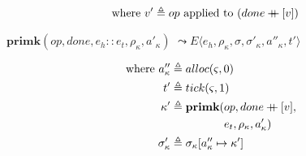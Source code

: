 \documentclass[12pt,draft]{article}
\newcommand\mdoubleplus{\ensuremath{\mathbin{+\mkern-9mu+}}}
\begin{document}
\begin{multicols*}{2}
\begin{align*}
\text{where } v' &\triangleq op \text{ applied to } (done \mdoubleplus [v])
\end{align*}
\begin{center}
  $\textbf{primk}(op, done, e_h::e_t, \rho_\kappa, a'_\kappa)$
  $\leadsto E\langle e_h , \rho_\kappa ,\sigma ,\sigma'_\kappa,a''_\kappa, t' \rangle$
\end{center}
\vspace{-7mm}
\begin{align*}
  \text{where }
  a''_\kappa &\triangleq alloc(\varsigma, 0) \\
  t' &\triangleq tick(\varsigma, 1) \\
  \kappa' &\triangleq \textbf{primk}(op, done \mdoubleplus [v],\\
             &\;\;\;\;\;\;\;\;\;\;\;\;\;\;\;\;\;e_t, \rho_\kappa, a'_\kappa) \\
  \sigma'_\kappa &\triangleq \sigma_\kappa[a''_\kappa \mapsto \kappa']
\end{align*}
\end{multicols*}
\newpage

\end{document}
